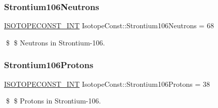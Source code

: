 \subsubsection{\texorpdfstring{Strontium106\+Neutrons}{Strontium106Neutrons}}
{\footnotesize\ttfamily \mbox{\hyperlink{group___isotope_const-_macros_ga5f18360b3e99483a35c32d789e62621c}{I\+S\+O\+T\+O\+P\+E\+C\+O\+N\+S\+T\+\_\+\+I\+NT}} Isotope\+Const\+::\+Strontium106\+Neutrons = 68}

\$ \$ Neutrons in Strontium-\/106. \mbox{\label{group___isotope_const-_strontium-_sr106_gaf5a72da8d139bca7e14b73e1f891e486}} 
\subsubsection{\texorpdfstring{Strontium106\+Protons}{Strontium106Protons}}
{\footnotesize\ttfamily \mbox{\hyperlink{group___isotope_const-_macros_ga5f18360b3e99483a35c32d789e62621c}{I\+S\+O\+T\+O\+P\+E\+C\+O\+N\+S\+T\+\_\+\+I\+NT}} Isotope\+Const\+::\+Strontium106\+Protons = 38}

\$ \$ Protons in Strontium-\/106. 